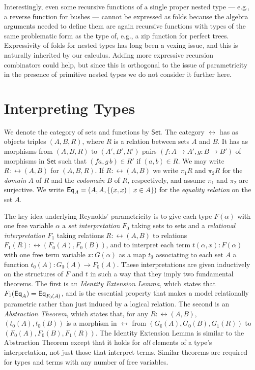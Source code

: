 \documentclass[runningheads]{llncs}
\newcommand{\set}{\mathsf{Set}}
\begin{document}
Interestingly, even some recursive functions of a single proper nested
type --- e.g., a reverse function for bushes --- cannot be expressed
as folds because the algebra arguments needed to define them are again
recursive functions with types of the same problematic form as the
type of, e.g., a zip function for perfect trees.  Expressivity of
folds for nested types has long been a vexing issue, and this is
naturally inherited by our calculus.  Adding more expressive recursion
combinators could help, but since this is orthogonal to the issue of
parametricity in the presence of primitive nested types we do not
consider it further here.

\vspace*{-0.15in}

\section{Interpreting Types}\label{sec:type-interp}

\vspace*{-0.1in}

We denote the category of sets and functions by $\set$. The category
$\rel$ has as objects triples $(A,B,R)$, where $R$ is a relation
between sets $A$ and $B$.  It has as morphisms from $(A,B,R)$ to
$(A',B',R')$ pairs $(f : A \to A',g : B \to B')$ of morphisms in
$\set$ such that $(f a,g\,b) \in R'$ if $(a,b) \in R$. We may write $R
: \rel(A,B)$ for $(A,B,R)$.  If $R : \rel(A,B)$ we write $\pi_1 R$ and
$\pi_2 R$ for the {\em domain} $A$ of $R$ and the {\em codomain} $B$
of $R$, respectively, and assume $\pi_1$ and $\pi_2$ are
surjective. We write $\mathsf{Eq}_A = (A,A,\{(x,x)~|~ x \in A\})$ for the {\em
  equality relation} on the set $A$.

The key idea underlying Reynolds' parametricity is to give each type
$F(\alpha)$ with one free variable $\alpha$ a {\em set interpretation}
$F_0$ taking sets to sets and a \emph{relational interpretation} $F_1$
taking relations $R : \rel(A,B)$ to relations $F_1 (R) : \rel(F_0 (A),
F_0 (B))$, and to interpret each term $t(\alpha,x) : F(\alpha)$ with
one free term variable $x : G(\alpha)$ as a map $t_0$ associating to
each set $A$ a function $t_0(A) : G_0(A) \to F_0(A)$. These
interpretations are given inductively on the structures of $F$ and $t$
in such a way that they imply two fundamental theorems. The first is
an \emph{Identity Extension Lemma}, which states that $F_1(\mathsf{Eq}_A) =
\mathsf{Eq}_{F_0(A)}$, and is the essential property that makes a model
relationally parametric rather than just induced by a logical
relation. The second is an \emph{Abstraction Theorem}, which states
that, for any $R :\rel(A, B)$, $(t_0(A),t_0(B))$ is a morphism in
$\rel$ from $(G_0(A),G_0(B),G_1(R))$ to $(F_0(A),F_0(B),F_1(R))$. The
Identity Extension Lemma is similar to the Abstraction Theorem except
that it holds for {\em all} elements of a type's interpretation, not
just those that interpret terms.  Similar theorems are required for
types and terms with any number of free variables.
\end{document}
